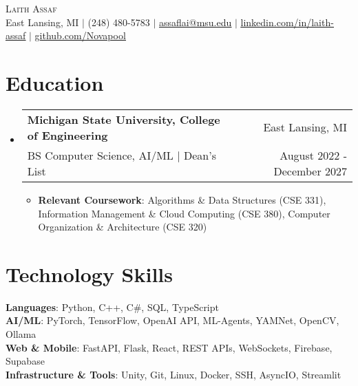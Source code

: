 \documentclass[letterpaper,11pt]{article}
\makeatletter
\newcommand{\resumeItem}[1]{
  \item\small{
    {#1 \vspace{-2pt}}
  }
}
\newcommand{\resumeSubheading}[4]{
  \vspace{-2pt}\item
    \begin{tabular*}{0.97\textwidth}[t]{l@{\extracolsep{\fill}}r}
      \textbf{#1} & \small #2 \\
      \small#3 & \small #4 \\
    \end{tabular*}\vspace{-7pt}
}
\newcommand{\resumeSubHeadingListStart}{\begin{itemize}[leftmargin=0.15in, label={}]}
\newcommand{\resumeSubHeadingListEnd}{\end{itemize}}
\newcommand{\resumeItemListStart}{\begin{itemize}}
\newcommand{\resumeItemListEnd}{\end{itemize}\vspace{-5pt}}
\makeatother
\begin{document}
\begin{center}
    {\Huge \scshape Laith Assaf} \\ \vspace{1pt}
    \small East Lansing, MI $|$ (248) 480-5783 $|$ \href{mailto:assaflai@msu.edu}{\underline{assaflai@msu.edu}} $|$ \href{https://linkedin.com/in/laith-assaf}{\underline{linkedin.com/in/laith-assaf}} $|$ \href{https://github.com/Novapool}{\underline{github.com/Novapool}}
\end{center}

\section{Education}
  \resumeSubHeadingListStart
    \resumeSubheading
      {Michigan State University, College of Engineering}{East Lansing, MI}
      {BS Computer Science, AI/ML $|$ Dean's List}{August 2022 - December 2027}
      \resumeItemListStart
        \resumeItem{\textbf{Relevant Coursework}: Algorithms \& Data Structures (CSE 331), Information Management \& Cloud Computing (CSE 380), Computer Organization \& Architecture (CSE 320)}
      \resumeItemListEnd
  \resumeSubHeadingListEnd

\section{Technology Skills}
 \begin{itemize}[leftmargin=0.15in, label={}]
    \small{\item{
     \textbf{Languages}{: Python, C++, C\#, SQL, TypeScript} \\
     \textbf{AI/ML}{: PyTorch, TensorFlow, OpenAI API, ML-Agents, YAMNet, OpenCV, Ollama} \\
     \textbf{Web \& Mobile}{: FastAPI, Flask, React, REST APIs, WebSockets, Firebase, Supabase} \\
     \textbf{Infrastructure \& Tools}{: Unity, Git, Linux, Docker, SSH, AsyncIO, Streamlit}
    }}
 \end{itemize}

\end{document}
